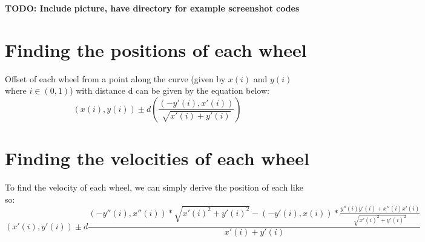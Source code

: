 \documentclass[12pt, english]{article}
\begin{document}
\textbf{TODO: Include picture, have directory for example screenshot codes}

\section{Finding the positions of each wheel}
Offset of each wheel from a point along the curve (given by $x(i)$ and $y(i)$ where $i\in(0,1)$) with distance d can be given by the equation below: \\
\begin{equation}
	(x(i), y(i)) \pm d \left(\frac{(-y'(i), x'(i))}{\sqrt{x'(i)+y'(i)}}\right)
\end{equation}

\section{Finding the velocities of each wheel}
To find the velocity of each wheel, we can simply derive the position of each like so:
\begin{equation}
	(x'(i), y'(i)) \pm d\frac{(-y''(i), x''(i))*\sqrt{x'(i)^2+y'(i)^2} - (-y'(i), x(i)) * \frac{y''(i)y'(i) + x''(i)x'(i)}{\sqrt{x'(i)^2+y'(i)^2}}}{x'(i)+y'(i)}
\end{equation}
\end{document}
